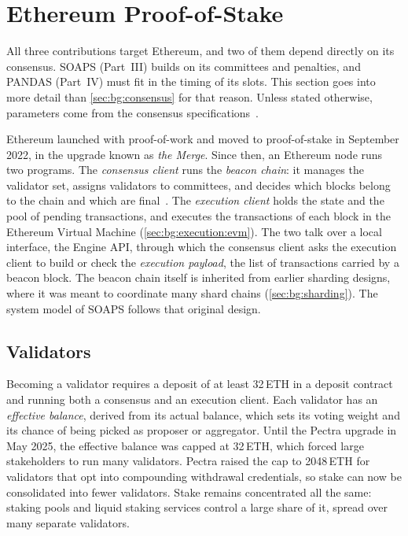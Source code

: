 \section{Ethereum Proof-of-Stake}\label{sec:bg:eth-pos}

All three contributions target Ethereum, and two of them depend directly on its consensus.
SOAPS (Part~III) builds on its committees and penalties, and PANDAS (Part~IV) must fit in the timing of its slots.
This section goes into more detail than \autoref{sec:bg:consensus} for that reason.
Unless stated otherwise, parameters come from the consensus specifications~\cite{ethconsensusspecs}.

Ethereum launched with proof-of-work and moved to proof-of-stake in September 2022, in the upgrade known as \emph{the Merge}.
Since then, an Ethereum node runs two programs.
The \emph{consensus client} runs the \emph{beacon chain}: it manages the validator set, assigns validators to committees, and decides which blocks belong to the chain and which are final~\cite{schwarzschilling2022three}.
The \emph{execution client} holds the state and the pool of pending transactions, and executes the transactions of each block in the Ethereum Virtual Machine (\autoref{sec:bg:execution:evm}).
The two talk over a local interface, the Engine API, through which the consensus client asks the execution client to build or check the \emph{execution payload}, the list of transactions carried by a beacon block.
The beacon chain itself is inherited from earlier sharding designs, where it was meant to coordinate many shard chains (\autoref{sec:bg:sharding}).
The system model of SOAPS follows that original design.

\subsection{Validators}\label{sec:bg:eth-pos:validators}

Becoming a validator requires a deposit of at least 32\,ETH in a deposit contract and running both a consensus and an execution client.
Each validator has an \emph{effective balance}, derived from its actual balance, which sets its voting weight and its chance of being picked as proposer or aggregator.
Until the Pectra upgrade in May 2025, the effective balance was capped at 32\,ETH, which forced large stakeholders to run many validators.
Pectra raised the cap to 2048\,ETH for validators that opt into compounding withdrawal credentials, so stake can now be consolidated into fewer validators.
Stake remains concentrated all the same: staking pools and liquid staking services control a large share of it, spread over many separate validators.

